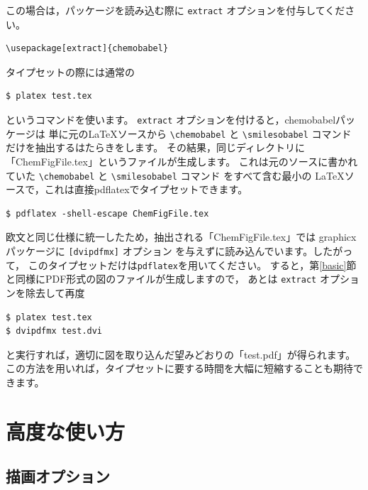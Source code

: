 \documentclass[12pt]{ltjsarticle}
\begin{document}
この場合は，パッケージを読み込む際に \verb|extract| オプションを付与してください。
\begin{verbatim}
\usepackage[extract]{chemobabel}
\end{verbatim}
タイプセットの際には通常の
\begin{verbatim}
$ platex test.tex
\end{verbatim}
というコマンドを使います。
\verb|extract| オプションを付けると，\textsf{chemobabel}パッケージは
単に元の\LaTeX ソースから \verb|\chemobabel| と \verb|\smilesobabel| コマンド
だけを抽出するはたらきをします。
その結果，同じディレクトリに「ChemFigFile.tex」というファイルが生成します。
これは元のソースに書かれていた \verb|\chemobabel| と \verb|\smilesobabel| コマンド
をすべて含む最小の \LaTeX ソースで，これは直接pdflatexでタイプセットできます。
\begin{verbatim}
$ pdflatex -shell-escape ChemFigFile.tex
\end{verbatim}
欧文と同じ仕様に統一したため，抽出される「ChemFigFile.tex」では
\textsf{graphicx}パッケージに \texttt{[dvipdfmx]} オプション
を与えずに読み込んでいます。したがって，
このタイプセットだけは\texttt{pdflatex}を用いてください。
すると，第\ref{basic}節と同様にPDF形式の図のファイルが生成しますので，
あとは \verb|extract| オプションを除去して再度
\begin{verbatim}
$ platex test.tex
$ dvipdfmx test.dvi
\end{verbatim}
と実行すれば，適切に図を取り込んだ望みどおりの「test.pdf」が得られます。
この方法を用いれば，タイプセットに要する時間を大幅に短縮することも期待できます。

\clearpage

\section{高度な使い方}

\subsection{描画オプション}
\label{depict}
\end{document}

